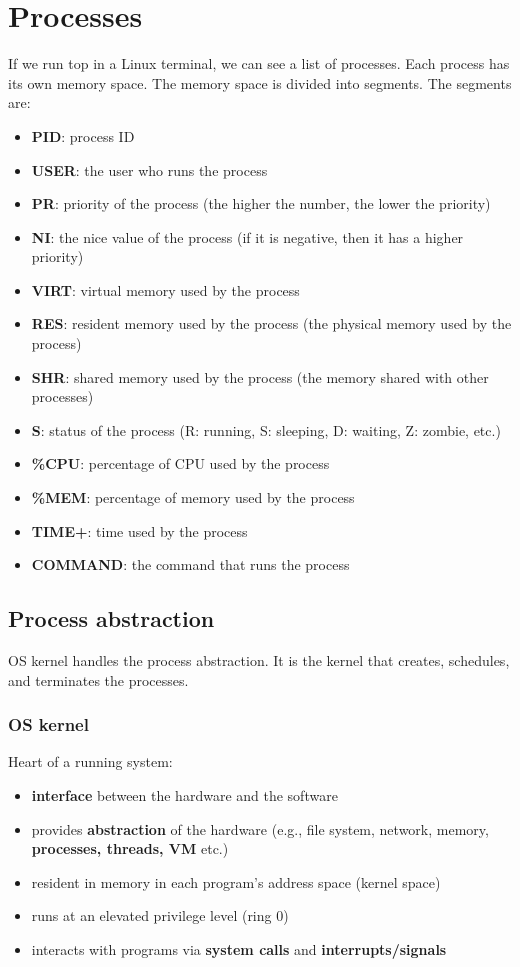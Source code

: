 \documentclass[letterpaper,12pt]{article}
\begin{document}
\section{Processes}
If we run top in a Linux terminal, we can see a list of processes. Each process
has its own memory space. The memory space is divided into segments. The
segments are: \begin{itemize}
    \item \textbf{PID}: process ID
    \item \textbf{USER}: the user who runs the process
    \item \textbf{PR}: priority of the process (the higher the number, the lower the priority)
    \item \textbf{NI}: the nice value of the process (if it is negative, then it has a higher priority)
    \item \textbf{VIRT}: virtual memory used by the process
    \item \textbf{RES}: resident memory used by the process (the physical memory used by the process)
    \item \textbf{SHR}: shared memory used by the process (the memory shared with other processes)
    \item \textbf{S}: status of the process (R: running, S: sleeping, D: waiting, Z: zombie, etc.)
    \item \textbf{\%CPU}: percentage of CPU used by the process
    \item \textbf{\%MEM}: percentage of memory used by the process
    \item \textbf{TIME+}: time used by the process
    \item \textbf{COMMAND}: the command that runs the process
\end{itemize}
\subsection{Process abstraction}
OS kernel handles the process abstraction. It is the kernel that creates,
schedules, and terminates the processes.
\subsubsection{OS kernel}
Heart of a running system:\begin{itemize}
    \item \textbf{interface} between the hardware and the software
    \item provides \textbf{abstraction} of the hardware (e.g., file system, network,
          memory, \textbf{processes, threads, VM} etc.)
    \item resident in memory in each program's address space (kernel space)
    \item runs at an elevated privilege level (ring 0)
    \item interacts with programs via \textbf{system calls} and
          \textbf{interrupts/signals}
\end{itemize}
\end{document}
